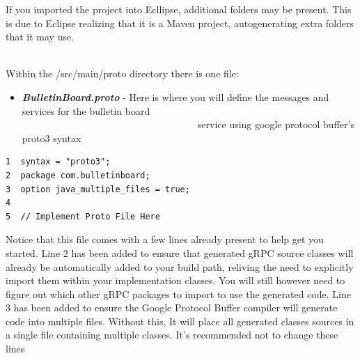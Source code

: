 \documentclass{article}
\newenvironment{file}[1][File]{ %
	\medskip
	\newcommand{\mdfilename}{#1}
	\begin{mdframed}[style=file]
}{
	\end{mdframed}
	\medskip
}
\newenvironment{info}[1][Info:]{ %
	\medskip
	\begin{mdframed}[style=info]
		\noindent{\textbf{#1}}
}{
	\end{mdframed}
}
\begin{document}
\begin{info}[Notice:]
If you imported the project into Ecllipse, additional folders may be present. This is due to Eclipse realizing that it is a Maven project, autogenerating extra folders that it may use.
\end{info}

\-\ \\Within the /src/main/proto directory there is one file:
\begin{itemize}
\item \textbf{\textit{BulletinBoard.proto}} - Here is where you will define the messages and services for the bulletin board\\  
\-\ \-\ \-\ \-\ \-\ \-\ \-\ \-\ \-\ \-\  \-\ \-\ \-\ \-\ \-\ \-\ \-\ \-\ \-\ \-\ \-\ \-\ \-\ \-\ \-\ \-\ \-\ \-\ \-\ \-\ \-\ \-\ \-\ \-\ \-\ \-\
service using google protocol buffer’s proto3 syntax
\end{itemize}

\begin{file}[BulletinBoard.proto]
\begin{lstlisting}[]
1  syntax = "proto3";
2  package com.bulletinboard;
3  option java_multiple_files = true;
4
5  // Implement Proto File Here
\end{lstlisting}
\end{file}
Notice that this file comes with a few lines already present to help get you started. Line 2 has been added to ensure that generated gRPC source classes will already be automatically added to your build path, reliving the need to explicitly import them within your implementation classes. You will still however need to figure out which other gRPC packages to import to use the generated code. Line 3 has been added to ensure the Google Protocol Buffer compiler will generate code into multiple files. Without this, It will place all generated classes sources in a single file containing multiple classes. It's recommended not to change these lines\\
\end{document}
